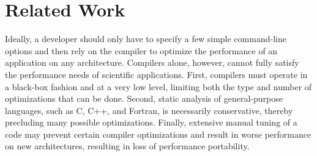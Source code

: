 \section{Related Work}
\label{sec:related}

%

Ideally, a developer should only have to specify a few simple command-line
options and then rely on the compiler to optimize the performance of an
application on any architecture. Compilers alone, however, cannot fully
satisfy the performance needs of scientific applications.  First,
compilers must operate in a black-box fashion and at a very low level,
limiting both the type and number of optimizations that can be done.  Second,
static analysis of general-purpose languages, such as C, C++, and Fortran, is
necessarily conservative, thereby precluding many possible optimizations.
Finally, extensive manual tuning of a code may prevent certain compiler optimizations
and result in worse performance on new architectures, resulting in 
loss of performance portability.

